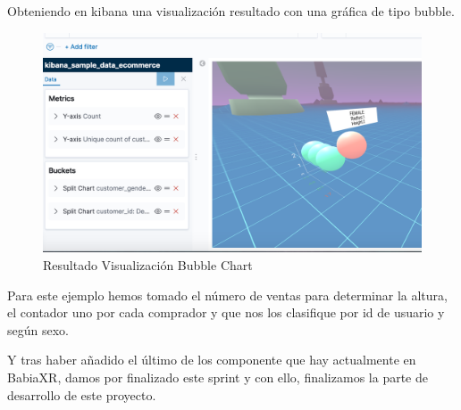 \documentclass[a4paper, 12pt]{book}
\begin{document}
Obteniendo en kibana una visualización resultado con una gráfica de tipo bubble.

\begin{figure}[H]
  \centering
  \includegraphics[width=12cm, keepaspectratio]{img/development/bubbles-chart.png}
  \caption{Resultado Visualización Bubble Chart}
  \label{fig:bubblechart}
\end{figure}

Para este ejemplo hemos tomado el número de ventas para determinar la altura, el contador uno por cada comprador y que nos los clasifique por id de usuario y según sexo.

Y tras haber añadido el último de los componente que hay actualmente en BabiaXR, damos por finalizado este sprint y con ello, finalizamos la parte de desarrollo de este proyecto.






\end{document}
